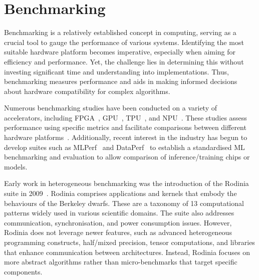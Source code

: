 \section{Benchmarking}
Benchmarking is a relatively established concept in computing, serving as a crucial tool to gauge the performance of various systems. Identifying the most suitable hardware platform becomes imperative, especially when aiming for efficiency and performance. Yet, the challenge lies in determining this without investing significant time and understanding into implementations. Thus, benchmarking measures performance and aids in making informed decisions about hardware compatibility for complex algorithms.

Numerous benchmarking studies have been conducted on a variety of accelerators, including FPGA~\cite{GauAltPin16}, GPU~\cite{AllHorAgar08}, TPU~\cite{JouYouPat18}, and NPU~\cite{qi2023vpuem}. These studies assess performance using specific metrics and facilitate comparisons between different hardware platforms~\cite{QasMurDen19}. Additionally, recent interest in the industry has begun to develop suites such as MLPerf~\cite{RedJanChe2020} and DataPerf~\cite{mazumder2023dataperf} to establish a standardised ML benchmarking and evaluation to allow comparison of inference/training chips or models.


Early work in heterogeneous benchmarking was the introduction of the Rodinia suite in 2009~\cite{CheBoyMic09}. Rodinia comprises applications and kernels that embody the behaviours of the Berkeley dwarfs. These are a taxonomy of 13 computational patterns widely used in various scientific domains. The suite also addresses communication, synchronisation, and power consumption issues. However, Rodinia does not leverage newer features, such as advanced heterogeneous programming constructs, half/mixed precision, tensor computations, and libraries that enhance communication between architectures. Instead, Rodinia focuses on more abstract algorithms rather than micro-benchmarks that target specific components.

